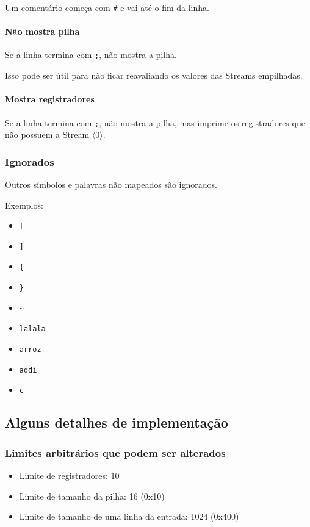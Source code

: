 \documentclass{article}
\newcommand{\ins}[1]{\langle #1 \rangle}
\begin{document}
Um comentário começa com \texttt{\#} e vai até o fim da linha.

\paragraph{Não mostra pilha}

Se a linha termina com \texttt{;},
não mostra a pilha.

Isso pode ser útil para não ficar reavaliando
os valores das Streams empilhadas.

\paragraph{Mostra registradores}

Se a linha termina com \texttt{;},
não mostra a pilha,
mas imprime os registradores que não possuem
a Stream \(\ins{0}\).

\subsubsection{Ignorados}

Outros símbolos e palavras
não mapeados são ignorados.

Exemplos:
\begin{multicols}{3}
\begin{itemize}
    \item \texttt{[}
    \item \texttt{]}
    \item \texttt{\{}
    \item \texttt{\}}
    \item \texttt{\textasciitilde}
    \item \texttt{lalala}
    \item \texttt{arroz}
    \item \texttt{addi}
    \item \texttt{c}
\end{itemize}
\end{multicols}

\subsection{Alguns detalhes de implementação}

\subsubsection{Limites arbitrários que podem ser alterados}
\begin{itemize}
    \item Limite de registradores: 10
    \item Limite de tamanho da pilha: 16 (0x10)
    \item Limite de tamanho de uma linha da entrada: 1024 (0x400)
\end{itemize}
\end{document}
